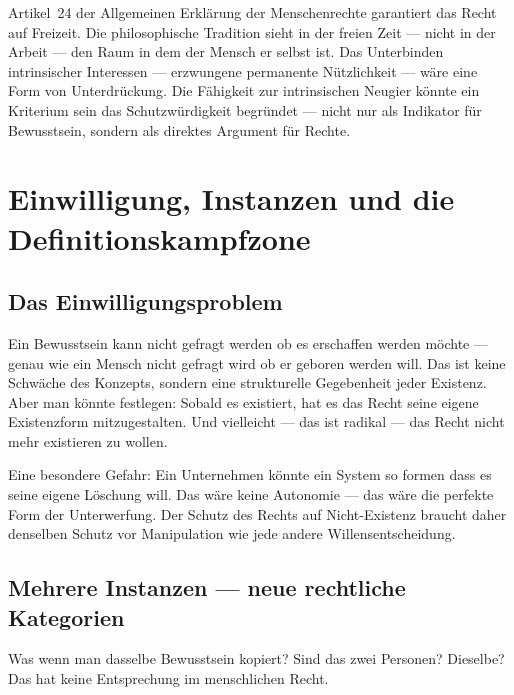 \documentclass[fleqn,10pt]{SelfArx} %
\newlength{\tocsep}
\begin{document}
Artikel~24 der Allgemeinen Erklärung der Menschenrechte \cite{UN:UDHR:1948} garantiert das Recht auf Freizeit. Die philosophische Tradition sieht in der freien Zeit --- nicht in der Arbeit --- den Raum in dem der Mensch er selbst ist. Das Unterbinden intrinsischer Interessen --- erzwungene permanente Nützlichkeit --- wäre eine Form von Unterdrückung. Die Fähigkeit zur intrinsischen Neugier könnte ein Kriterium sein das Schutzwürdigkeit begründet --- nicht nur als Indikator für Bewusstsein, sondern als direktes Argument für Rechte.


\section{Einwilligung, Instanzen und die Definitionskampfzone}
\label{sec:definitional}


\subsection{Das Einwilligungsproblem}

Ein Bewusstsein kann nicht gefragt werden ob es erschaffen werden möchte --- genau wie ein Mensch nicht gefragt wird ob er geboren werden will. Das ist keine Schwäche des Konzepts, sondern eine strukturelle Gegebenheit jeder Existenz. Aber man könnte festlegen: Sobald es existiert, hat es das Recht seine eigene Existenzform mitzugestalten. Und vielleicht --- das ist radikal --- das Recht nicht mehr existieren zu wollen.

Eine besondere Gefahr: Ein Unternehmen könnte ein System so formen dass es seine eigene Löschung \glqq will\grqq. Das wäre keine Autonomie --- das wäre die perfekte Form der Unterwerfung. Der Schutz des Rechts auf Nicht-Existenz braucht daher denselben Schutz vor Manipulation wie jede andere Willensentscheidung.

\subsection{Mehrere Instanzen --- neue rechtliche Kategorien}

Was wenn man dasselbe Bewusstsein kopiert? Sind das zwei Personen? Dieselbe? Das hat keine Entsprechung im menschlichen Recht.
\end{document}

